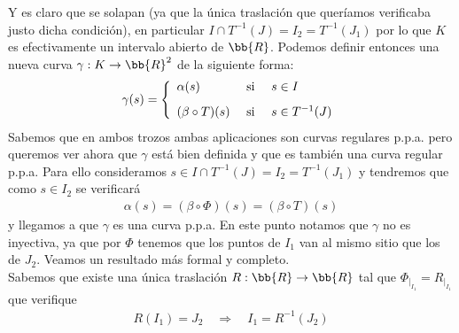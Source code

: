 \begin{observacion}
\begin{enumerate}
        Y es claro que se solapan (ya que la única traslación que queríamos verificaba justo dicha condición), en particular $I\cap T^{-1}(J) = I_2 = T^{-1}(J_1)$ por lo que $K$ es efectivamente un intervalo abierto de $\bb{R}$. Podemos definir entonces una nueva curva $\gamma:K \to \bb{R}^2$ de la siguiente forma:
        \begin{gather*}
            \gamma(s) = \left\{
                \begin{array}{l c l}
                    \alpha(s) & \text{ si } & s\in I\\[0.8em]
                    (\beta \circ T)(s) & \text{ si } & s \in T^{-1}(J)
                \end{array}
            \right.
        \end{gather*}
        Sabemos que en ambos trozos ambas aplicaciones son curvas regulares p.p.a. pero queremos ver ahora que $\gamma$ está bien definida y que es también una curva regular p.p.a. Para ello consideramos $s\in I\cap T^{-1}(J)=I_2 = T^{-1}(J_1)$ y tendremos que como $s\in I_2$ se verificará
        \begin{gather*}
            \alpha(s) = (\beta \circ \Phi)(s) = (\beta \circ T)(s)
        \end{gather*}
        y llegamos a que $\gamma$ es una curva p.p.a. En este punto notamos que $\gamma$ no es inyectiva, ya que por $\Phi$ tenemos que los puntos de $I_1$ van al mismo sitio que los de $J_2$. Veamos un resultado más formal y completo.\\

        Sabemos que existe una única traslación $R:\bb{R}\to \bb{R}$ tal que $\Phi_{|_{I_1}} = R_{|_{I_1}}$ que verifique 
        \begin{gather*}
            R(I_1) = J_2 \quad \Rightarrow \quad I_1 = R^{-1}(J_2)
        \end{gather*}
        \begin{figure}[H]
            \centering
\end{figure}
\end{enumerate}
\end{observacion}
